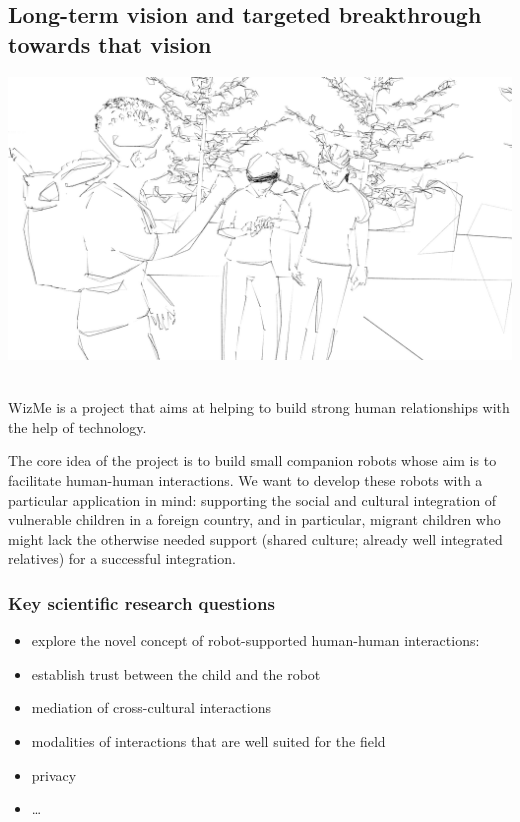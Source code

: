 \documentclass[]{article}
\providecommand{\tightlist}{%
  \setlength{\itemsep}{0pt}\setlength{\parskip}{0pt}}
\begin{document}
\hypertarget{long-term-vision-and-targeted-breakthrough-towards-that-vision}{%
\subsection{Long-term vision and targeted breakthrough towards that
vision}\label{long-term-vision-and-targeted-breakthrough-towards-that-vision}}

\includegraphics{figs/render5.png}~

WizMe is a project that aims at helping to build strong human
relationships with the help of technology.

The core idea of the project is to build small companion robots whose
aim is to facilitate human-human interactions. We want to develop these
robots with a particular application in mind: supporting the social and
cultural integration of vulnerable children in a foreign country, and in
particular, migrant children who might lack the otherwise needed support
(shared culture; already well integrated relatives) for a successful
integration.

\hypertarget{key-scientific-research-questions}{%
\subsubsection{Key scientific research
questions}\label{key-scientific-research-questions}}

\begin{itemize}
\tightlist
\item
  explore the novel concept of robot-supported human-human interactions:
\item
  establish trust between the child and the robot
\item
  mediation of cross-cultural interactions
\item
  modalities of interactions that are well suited for the field
\item
  privacy
\item
  \ldots{}
\end{itemize}
\end{document}
